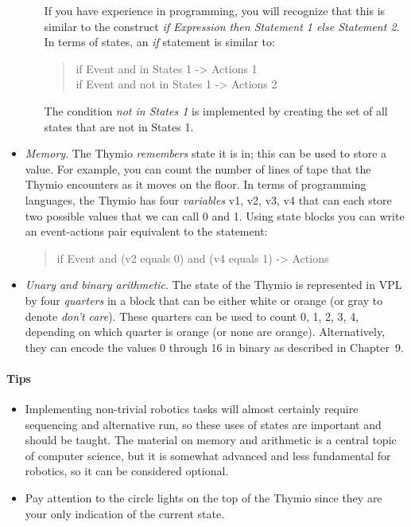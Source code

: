 \documentclass[11pt,a4paper,english]{article}
\begin{document}
\begin{itemize}
\begin{itemize}
If you have experience in programming, you will recognize that this is
similar to the construct \textit{if Expression then Statement 1 else
Statement 2}. In terms of states, an \textit{if} statement is similar
to:

\begin{quote}
if Event and in States 1 -> Actions 1\\
if Event and not in States 1 -> Actions 2
\end{quote}

The condition \emph{not in States 1} is implemented by creating
the set of all states that are not in States 1.

\end{itemize}

\item \emph{Memory}. The Thymio \emph{remembers} state it is in; this
can be used to store a value. For example, you can count the number of
lines of tape that the Thymio encounters as it moves on the floor. In
terms of programming languages, the Thymio has four \emph{variables} v1,
v2, v3, v4 that can each store two possible values that we can call 0
and 1. Using state blocks you can write an event-actions pair equivalent
to the statement:

\begin{quote}
if Event and (v2 equals 0) and (v4 equals 1) -> Actions
\end{quote}

\item \emph{Unary and binary arithmetic}. The state of the Thymio is
represented in VPL by four \textit{quarters} in a block that can be
either white or orange (or gray to denote \textit{don't care}). These
quarters can be used to count 0, 1, 2, 3, 4, depending on which quarter
is orange (or none are orange). Alternatively, they can encode the
values 0 through 16 in binary as described in Chapter~9.

\end{itemize}
\paragraph{Tips}
\begin{itemize}

\item Implementing non-trivial robotics tasks will almost certainly
require sequencing and alternative run, so these uses of states are
important and should be taught. The material on memory and arithmetic is
a central topic of computer science, but it is somewhat advanced and
less fundamental for robotics, so it can be considered optional.

\item Pay attention to the circle lights on the top of the Thymio since
they are your only indication of the current state.

\end{itemize}
\end{document}
